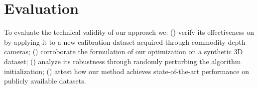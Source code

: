 \section{Evaluation}
To evaluate the technical validity of our approach we:
() verify its effectiveness on by applying it to a new calibration dataset acquired through commodity depth cameras;
() corroborate the formulation of our optimization on a synthetic 3D dataset;
() analyze its robustness through randomly perturbing the algorithm initialization; 
() attest how our method achieves state-of-the-art performance on publicly available datasets.




